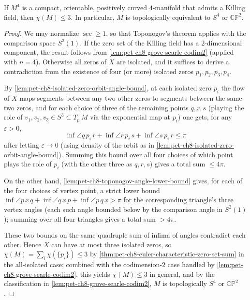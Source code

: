 \begin{theorem}
  \label{thm:pet-ch8-hsiang-kleiner-4manifold}
  If $M^4$ is a compact, orientable, positively curved $4$-manifold that admits
  a Killing field, then $\chi(M)\le3$. In particular, $M$ is topologically
  equivalent to $S^4$ or $\mathbb{CP}^2$.
\end{theorem}
\begin{proof}
  We may normalize $\sec\ge1$, so that Toponogov's theorem applies with the
  comparison space $S^2(1)$. If the zero set of the Killing field has a
  $2$-dimensional component, the result follows from
  \cref{lem:pet-ch8-grove-searle-codim2} (applied with $n=4$). Otherwise all
  zeros of $X$ are isolated, and it suffices to derive a contradiction from the
  existence of four (or more) isolated zeros $p_1,p_2,p_3,p_4$.

  By \cref{lem:pet-ch8-isolated-zero-orbit-angle-bound}, at each isolated zero
  $p_i$ the flow of $X$ maps segments between any two other zeros to segments
  between the same two zeros, and for each choice of three of the remaining
  points $q,r,s$ (playing the role of $v_1,v_2,v_3\in S^3\subset T_{p_i}M$ via
  the exponential map at $p_i$) one gets, for any $\varepsilon>0$,
  \[
    \inf\angle q\,p_i\,r+\inf\angle r\,p_i\,s+\inf\angle s\,p_i\,r\le\pi
  \]
  after letting $\varepsilon\to0$ (using density of the orbit as in
  \cref{lem:pet-ch8-isolated-zero-orbit-angle-bound}). Summing this bound over
  all four choices of which point plays the role of $p_i$ (with the other three
  as $q,r,s$) gives a total sum $\le4\pi$.

  On the other hand, \cref{lem:pet-ch8-toponogov-angle-lower-bound} gives, for
  each of the four choices of vertex point, a strict lower bound
  $\inf\angle p\,x\,q+\inf\angle q\,x\,p+\inf\angle p\,q\,x>\pi$ for the
  corresponding triangle's three vertex angles (each such angle bounded below
  by the comparison angle in $S^2(1)$); summing over all four triangles gives a
  total sum $>4\pi$.

  These two bounds on the same quadruple sum of infima of angles contradict
  each other. Hence $X$ can have at most three isolated zeros, so
  $\chi(M)=\sum_i\chi(\{p_i\})\le3$ by \cref{thm:pet-ch8-euler-characteristic-zero-set-sum}
  in the all-isolated case; combined with the codimension-$2$ case handled by
  \cref{lem:pet-ch8-grove-searle-codim2}, this yields $\chi(M)\le3$ in general,
  and by the classification in \cref{lem:pet-ch8-grove-searle-codim2}, $M$ is
  topologically $S^4$ or $\mathbb{CP}^2$.
\end{proof}

